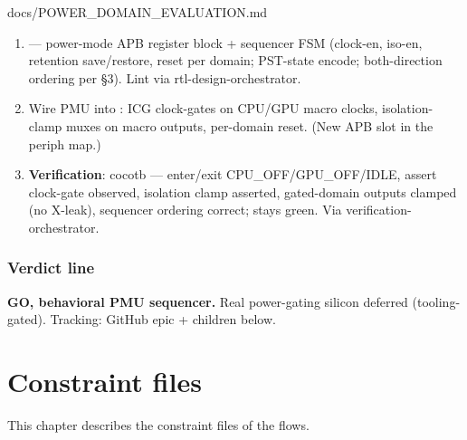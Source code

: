 \begin{relocated}{docs/POWER_DOMAIN_EVALUATION.md}
\begin{enumerate}
\def\labelenumi{\arabic{enumi}.}
\tightlist
\item
  \textbf{} --- power-mode APB register block +
  sequencer FSM (clock-en, iso-en, retention save/\allowbreak{}restore,
  reset per domain; PST-state encode; both-direction ordering per §3).
  Lint via rtl-design-orchestrator.
\item
  Wire PMU into : ICG clock-gates on CPU/GPU macro clocks,
  isolation-clamp muxes on macro outputs, per-domain reset. (New APB
  slot in the periph map.)
\item
  \textbf{Verification}: cocotb  ---
  enter/\allowbreak{}exit
  CPU\_\allowbreak{}OFF/\allowbreak{}GPU\_\allowbreak{}OFF/\allowbreak{}IDLE,
  assert clock-gate observed, isolation clamp asserted, gated-domain
  outputs clamped (no X-leak), sequencer ordering correct;
   stays green. Via verification-orchestrator.
\end{enumerate}

\subsection{Verdict line}\label{tm:pd:power-domain-evaluation:7-verdict-line}

\textbf{GO, behavioral PMU sequencer.} Real power-gating silicon
deferred (tooling-gated). Tracking: GitHub epic + children below.
\end{relocated}

\chapter{Constraint files}\label{tm:ch:constraint-files}

This chapter describes the constraint files of the flows.

